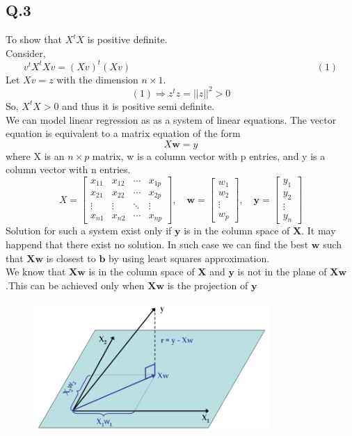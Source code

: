 \documentclass[17pt]{article}
\begin{document}
\subsection*{Q.3}
To show that $X^tX$ is positive definite.\\
Consider,
$$v^{t}X^{t}Xv=(Xv)^{t}(Xv) \hspace{8cm}(1)$$
Let $Xv=z$ with the dimension $n \times 1$.\\
$$(1) \Rightarrow z^{t}z=||z||^{2}>0$$
So, $X^{t}X > 0$ and thus it is positive semi definite.\\
We can model linear regression as as a system of linear equations.
The vector equation is equivalent to a matrix equation of the form
 $$ X{\mathbf {w}}={ {y}}$$
where X is an $n \times p$ matrix, w is a column vector with p entries, and y is a column vector with n entries.
   $$X={\begin{bmatrix}x_{11}&x_{12}&\cdots &x_{1p}\\x_{21}&x_{22}&\cdots &x_{2p}\\\vdots &\vdots &\ddots &\vdots \\x_{n1}&x_{n2}&\cdots &x_{np}\end{bmatrix}},\quad {\mathbf {w}}={\begin{bmatrix}w_{1}\\w_{2}\\\vdots \\w_{p}\end{bmatrix}},\quad {\mathbf {y}}={\begin{bmatrix}y_{1}\\y_{2}\\\vdots \\y_{n}\end{bmatrix}}$$
Solution for such a system exist only if $\textbf{y}$ is in the column space of $\textbf{X}$. It may happend that there exist no solution. In such case we can find the best $\textbf{w}$ such that $\textbf{Xw}$  is closest to $\textbf{b}$ by using least squares approximation.\\
We know that $\textbf{Xw}$ is in the column space of $\textbf{X}$ and $\textbf{y}$ is not in the plane of $\textbf{Xw}$.This can be achieved only when $\textbf{Xw}$ is the projection of $\textbf{y}$  
\\
\begin{figure}[h!]
	\centering
	\includegraphics[width=90mm]{ols-regression-geometry.png}
	\caption{\label{convex}}
\end{figure}
\end{document}
